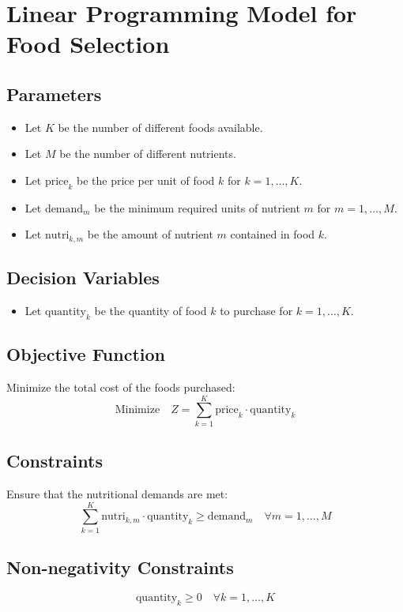 \documentclass{article}
\begin{document}
\section*{Linear Programming Model for Food Selection}

\subsection*{Parameters}
\begin{itemize}
    \item Let \( K \) be the number of different foods available.
    \item Let \( M \) be the number of different nutrients.
    \item Let \( \text{price}_k \) be the price per unit of food \( k \) for \( k = 1, \ldots, K \).
    \item Let \( \text{demand}_m \) be the minimum required units of nutrient \( m \) for \( m = 1, \ldots, M \).
    \item Let \( \text{nutri}_{k,m} \) be the amount of nutrient \( m \) contained in food \( k \).
\end{itemize}

\subsection*{Decision Variables}
\begin{itemize}
    \item Let \( \text{quantity}_k \) be the quantity of food \( k \) to purchase for \( k = 1, \ldots, K \).
\end{itemize}

\subsection*{Objective Function}
Minimize the total cost of the foods purchased:
\[
\text{Minimize} \quad Z = \sum_{k=1}^{K} \text{price}_k \cdot \text{quantity}_k
\]

\subsection*{Constraints}
Ensure that the nutritional demands are met:
\[
\sum_{k=1}^{K} \text{nutri}_{k,m} \cdot \text{quantity}_k \geq \text{demand}_m \quad \forall m = 1, \ldots, M
\]

\subsection*{Non-negativity Constraints}
\[
\text{quantity}_k \geq 0 \quad \forall k = 1, \ldots, K
\]
\end{document}
